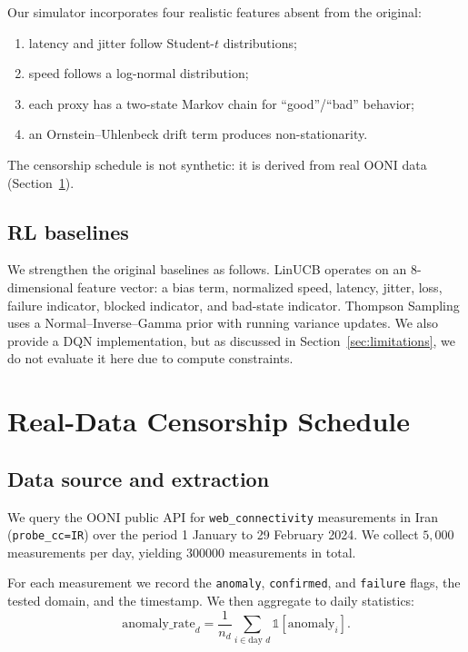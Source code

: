 \documentclass[11pt,a4paper]{article}
\begin{document}
Our simulator incorporates four realistic features absent from the
original:
\begin{enumerate}[leftmargin=*]
  \item latency and jitter follow Student-$t$ distributions;
  \item speed follows a log-normal distribution;
  \item each proxy has a two-state Markov chain for
  ``good''/``bad'' behavior;
  \item an Ornstein--Uhlenbeck drift term produces non-stationarity.
\end{enumerate}
The censorship schedule is not synthetic: it is derived from real
OONI data (Section~\ref{sec:realdata}).

\subsection{RL baselines}

We strengthen the original baselines as follows. LinUCB operates on
an 8-dimensional feature vector: a bias term, normalized speed,
latency, jitter, loss, failure indicator, blocked indicator, and
bad-state indicator. Thompson Sampling uses a Normal--Inverse--Gamma
prior with running variance updates. We also provide a DQN
implementation, but as discussed in Section~\ref{sec:limitations},
we do not evaluate it here due to compute constraints.

\section{Real-Data Censorship Schedule}
\label{sec:realdata}

\subsection{Data source and extraction}

We query the OONI public API for \texttt{web\_connectivity}
measurements in Iran (\texttt{probe\_cc=IR}) over the period
1 January to 29 February 2024. We collect $5{,}000$ measurements per
day, yielding \num{300000} measurements in total.

For each measurement we record the \texttt{anomaly},
\texttt{confirmed}, and \texttt{failure} flags, the tested domain, and
the timestamp. We then aggregate to daily statistics:
\[
\text{anomaly\_rate}_d = \frac{1}{n_d} \sum_{i \in \text{day } d} \mathbb{1}[\text{anomaly}_i].
\]
\end{document}
